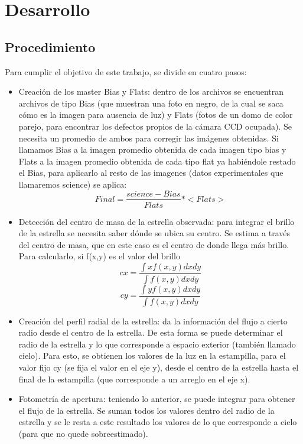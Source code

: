 \documentclass[a4paper, 11pt, spanish]{article}
\begin{document}
\section{Desarrollo}
\subsection{Procedimiento}

Para cumplir el objetivo de este trabajo, se divide en cuatro pasos:

\begin{itemize}
	\item Creaci\'on de los master Bias y Flats: dentro de los archivos se encuentran archivos de tipo Bias (que muestran una foto en negro, de la cual se saca c\'omo es la imagen para ausencia de luz) y Flats (fotos de un domo de color parejo, para encontrar los defectos propios de la c\'amara CCD ocupada). Se necesita un promedio de ambos para corregir las im\'agenes obtenidas. Si llamamos Bias a la imagen promedio obtenida de cada imagen tipo bias y Flats a la imagen promedio obtenida de cada tipo flat ya habi\'endole restado el Bias, para aplicarlo al resto de las imagenes (datos experimentales que llamaremos science) se aplica:
	\begin{equation*}
	Final = \frac{science - Bias}{Flats} * <Flats>
	\end{equation*}
	\item Detecci\'on del centro de masa de la estrella observada: para integrar el brillo de la estrella se necesita saber d\'onde se ubica su centro. Se estima a trav\'es del centro de masa, que en este caso es el centro de donde llega m\'as brillo. Para calcularlo, si f(x,y) es el valor del brillo 
	\begin{equation*}
	cx = \frac{\int xf(x,y) dx dy}{\int f(x,y) dx dy}
	\end{equation*}
	\begin{equation*}
	cy = \frac{\int yf(x,y) dx dy}{\int f(x,y) dx dy}
	\end{equation*}
	\item Creaci\'on del perfil radial de la estrella: da la informaci\'on del flujo a cierto radio desde el centro de la estrella. De esta forma se puede determinar el radio de la estrella y lo que corresponde a espacio exterior (tambi\'en llamado cielo). Para esto, se obtienen los valores de la luz en la estampilla, para el valor fijo cy (se fija el valor en el eje y), desde el centro de la estrella hasta el final de la estampilla (que corresponde a un arreglo en el eje x). 
	\item Fotometr\'ia de apertura: teniendo lo anterior, se puede integrar para obtener el flujo de la estrella. Se suman todos los valores dentro del radio de la estrella y se le resta a este resultado los valores de lo que corresponde a cielo (para que no quede sobreestimado).
\end{itemize}
\end{document}
